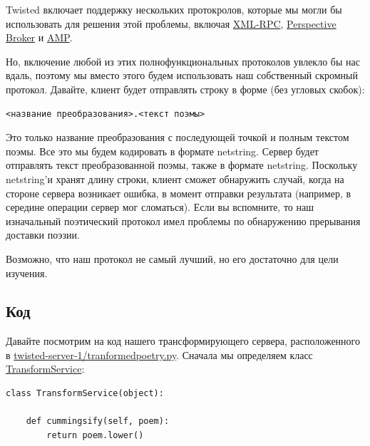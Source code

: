 Twisted включает поддержку нескольких протокролов, 
которые мы могли бы использовать для решения этой 
проблемы, включая \href{http://twistedmatrix.com/trac/browser/tags/releases/twisted-8.2.0/twisted/web/xmlrpc.py}{XML-RPC}, \href{http://twistedmatrix.com/documents/current/core/howto/pb-intro.html}{Perspective Broker} и \href{http://twistedmatrix.com/trac/browser/tags/releases/twisted-8.2.0/twisted/protocols/amp.py}{AMP}. 


Но, включение любой из этих полнофункциональных протоколов 
увлекло бы нас вдаль, поэтому мы вместо этого будем использовать 
наш собственный скромный протокол. Давайте, клиент будет отправлять 
строку в форме (без угловых скобок):

\begin{scriptsize}\begin{verbatim}
<название преобразования>.<текст поэмы>
\end{verbatim}\end{scriptsize}


Это только название преобразования с последующей точкой и 
полным текстом поэмы. Все это мы будем кодировать в формате netstring. 
Сервер будет отправлять текст преобразованной поэмы, также в формате  
netstring. Поскольку netstring'и хранят длину строки, клиент 
сможет обнаружить случай, когда на стороне сервера возникает ошибка, 
в момент отправки результата (например, в середине операции сервер мог сломаться). 
Если вы вспомните, то наш изначальный поэтический протокол 
имел проблемы по обнаружению прерывания доставки поэзии.  


Возможно, что наш протокол не самый лучший, но его достаточно 
для цели изучения.

\subsection{Код}

Давайте посмотрим на код нашего трансформирующего сервера, 
расположенного в \href{http://github.com/jdavisp3/twisted-intro/blob/master/twisted-server-1/tranformedpoetry.py#L1}{twisted-server-1/tranformedpoetry.py}. Сначала мы определяем 
класс \href{http://github.com/jdavisp3/twisted-intro/blob/master/twisted-server-1/tranformedpoetry.py#L41}{TransformService}:

\begin{scriptsize}\begin{verbatim}
class TransformService(object):

    def cummingsify(self, poem):
        return poem.lower()
\end{verbatim}\end{scriptsize}


